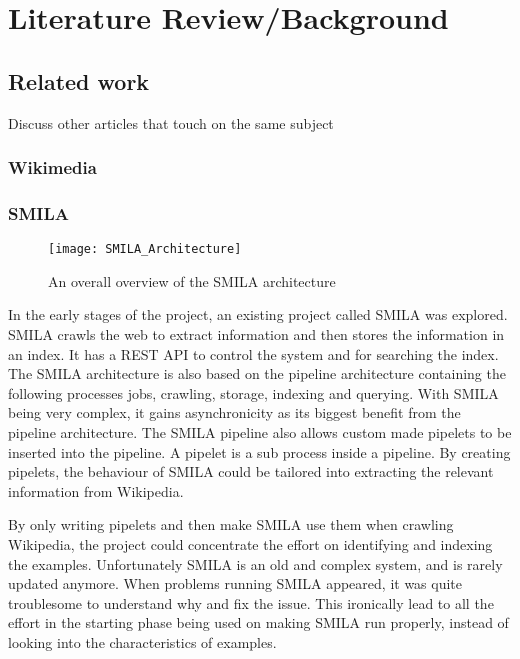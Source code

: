 
\chapter{Literature Review/Background}


\section{Related work}
Discuss other articles that touch on the same subject

\subsection{Wikimedia}


\subsection{SMILA} \label{smila}

\begin{figure}[h]
\caption{An overall overview of the SMILA architecture}
\texttt{[image: SMILA\_Architecture]}
\end{figure}



In the early stages of the project, an existing project called SMILA was explored. SMILA crawls the web to extract information and then stores the information in an index. It has a REST API to control the system and for searching the index. The SMILA architecture is also based on the pipeline architecture containing the following processes jobs, crawling, storage, indexing and querying. With SMILA being very complex, it gains asynchronicity as its biggest benefit from the pipeline architecture. The SMILA pipeline also allows custom made pipelets to be inserted into the pipeline. A pipelet is a sub process inside a pipeline. By creating pipelets, the behaviour of SMILA could be tailored into extracting the relevant information from Wikipedia.

By only writing pipelets and then make SMILA use them when crawling Wikipedia, the project could concentrate the effort on identifying and indexing the examples. Unfortunately SMILA is an old and complex system, and is rarely updated anymore. When problems running SMILA appeared, it was quite troublesome to understand why and fix the issue. This ironically lead to all the effort in the starting phase being used on making SMILA run properly, instead of looking into the characteristics of examples. 

